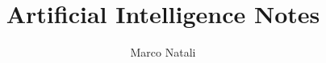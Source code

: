 \documentclass[a4paper, openany]{book}
\theoremstyle{definition}%
\begin{document}
    \title{Artificial Intelligence Notes}
    \author{Marco Natali}
    \date{}
    \maketitle 
  
  \tableofcontents
  \listoffigures

      
\end{document}
